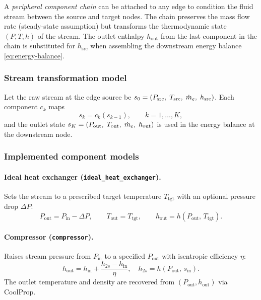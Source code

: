 A \emph{peripheral component chain} can be attached to any edge to condition
the fluid stream between the source and target nodes.  The chain preserves the
mass flow rate (steady-state assumption) but transforms the thermodynamic state
$(P, T, h)$ of the stream.  The outlet enthalpy $h_\text{out}$ from the last
component in the chain is substituted for $h_\text{src}$ when assembling the
downstream energy balance \cref{eq:energy-balance}.

\subsubsection{Stream transformation model}

Let the raw stream at the edge source be $s_0 = (P_\text{src},\; T_\text{src},\;
\dot{m}_e,\; h_\text{src})$.  Each component $c_k$ maps
\begin{equation}
  s_k = c_k(s_{k-1}), \qquad k = 1,\dots,K,
\end{equation}
and the outlet state $s_K = (P_\text{out},\; T_\text{out},\; \dot{m}_e,\;
h_\text{out})$ is used in the energy balance at the downstream node.

\subsubsection{Implemented component models}

\paragraph{Ideal heat exchanger (\texttt{ideal\_heat\_exchanger}).}
Sets the stream to a prescribed target temperature $T_\text{tgt}$ with an
optional pressure drop $\Delta P$:
\begin{equation}
  P_\text{out} = P_\text{in} - \Delta P,\qquad
  T_\text{out} = T_\text{tgt},\qquad
  h_\text{out} = h(P_\text{out},\, T_\text{tgt}).
\end{equation}

\paragraph{Compressor (\texttt{compressor}).}
Raises stream pressure from $P_\text{in}$ to a specified $P_\text{out}$ with
isentropic efficiency $\eta$:
\begin{equation}
  h_\text{out} = h_\text{in} + \frac{h_{2s} - h_\text{in}}{\eta},\quad
  h_{2s} = h(P_\text{out},\, s_\text{in}).
  \label{eq:compressor}
\end{equation}
The outlet temperature and density are recovered from $(P_\text{out},
h_\text{out})$ via CoolProp.

